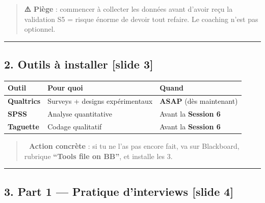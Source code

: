 \documentclass[
]{article}
\begin{document}
\begin{quote}
\textbf{⚠️ Piège} : commencer à collecter les données avant d'avoir reçu
la validation S5 = risque énorme de devoir tout refaire. Le coaching
n'est pas optionnel.
\end{quote}

\begin{center}\rule{0.5\linewidth}{0.5pt}\end{center}

\subsection{2. Outils à installer {[}slide
3{]}}\label{outils-uxe0-installer-slide-3}

\begin{longtable}[]{@{}
  >{\raggedright\arraybackslash}p{}
  >{\raggedright\arraybackslash}p{}
  >{\raggedright\arraybackslash}p{}@{}}
\toprule\noalign{}
\begin{minipage}[b]{\linewidth}\raggedright
Outil
\end{minipage} & \begin{minipage}[b]{\linewidth}\raggedright
Pour quoi
\end{minipage} & \begin{minipage}[b]{\linewidth}\raggedright
Quand
\end{minipage} \\
\midrule\noalign{}
\endhead
\bottomrule\noalign{}
\endlastfoot
\textbf{Qualtrics} & Surveys + designs expérimentaux & \textbf{ASAP}
(dès maintenant) \\
\textbf{SPSS} & Analyse quantitative & Avant la \textbf{Session 6} \\
\textbf{Taguette} & Codage qualitatif & Avant la \textbf{Session 6} \\
\end{longtable}

\begin{quote}
\textbf{🎯 Action concrète} : si tu ne l'as pas encore fait, va sur
Blackboard, rubrique \textbf{``Tools file on BB''}, et installe les 3.
\end{quote}

\begin{center}\rule{0.5\linewidth}{0.5pt}\end{center}

\subsection{3. Part 1 --- Pratique d'interviews {[}slide
4{]}}\label{part-1-pratique-dinterviews-slide-4}
\end{document}
